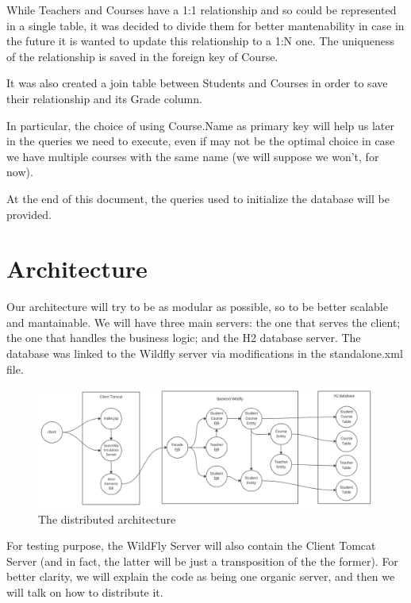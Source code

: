 \documentclass[12pt, a4paper]{article}
\begin{document}
  While Teachers and Courses have a 1:1 relationship and so could be represented in a single table, it was decided to divide them for better mantenability in case in the future it is wanted to update this relationship to a 1:N one. The uniqueness of the relationship is saved in the foreign key of Course.

  It was also created a join table between Students and Courses in order to save their relationship and its Grade column.

  In particular, the choice of using Course.Name as primary key will help us later in the queries we need to execute, even if may not be the optimal choice in case we have multiple courses with the same name (we will suppose we won't, for now).

  At the end of this document, the queries used to initialize the database will be provided.

  \section{Architecture}

  Our architecture will try to be as modular as possible, so to be better scalable and mantainable. We will have three main servers: the one that serves the client; the one that handles the business logic; and the H2 database server. The database was linked to the Wildfly server via modifications in the standalone.xml file.

  \begin{figure}[H]
    \centering
    \includegraphics[width=\columnwidth]{architecture.png}
    \caption{The distributed architecture}
  \end{figure}

  For testing purpose, the WildFly Server will also contain the Client Tomcat Server (and in fact, the latter will be just a transposition of the the former). For better clarity, we will explain the code as being one organic server, and then we will talk on how to distribute it.
\end{document}
